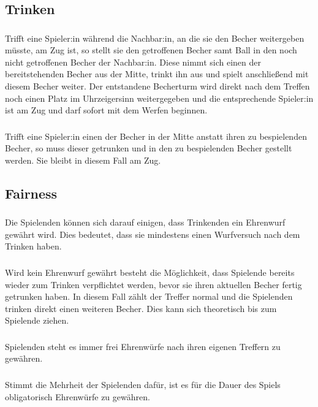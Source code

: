 \subsection{Trinken}
\subsubsection{}
Trifft eine Spieler:in während die Nachbar:in, an die sie den Becher weitergeben müsste, am Zug ist, so stellt sie den getroffenen Becher samt Ball in den noch nicht getroffenen Becher der Nachbar:in.
Diese nimmt sich einen der bereitstehenden Becher aus der Mitte, trinkt ihn aus und spielt anschließend mit diesem Becher weiter.
Der entstandene Becherturm wird direkt nach dem Treffen noch einen Platz im Uhrzeigersinn weitergegeben und die entsprechende Spieler:in ist am Zug und darf sofort mit dem Werfen beginnen.

\subsubsection{}
Trifft eine Spieler:in einen der Becher in der Mitte anstatt ihren zu bespielenden Becher, so muss dieser getrunken und in den zu bespielenden Becher gestellt werden.
Sie bleibt in diesem Fall am Zug.

\subsection{Fairness}
\subsubsection{}
Die Spielenden können sich darauf einigen, dass Trinkenden ein \glqq{} Ehrenwurf\grqq{} gewährt wird.
Dies bedeutet, dass sie mindestens einen Wurfversuch nach dem Trinken haben.

\subsubsection{}
Wird kein Ehrenwurf gewährt besteht die Möglichkeit, dass Spielende bereits wieder zum Trinken verpflichtet werden, bevor sie ihren aktuellen Becher fertig getrunken haben.
In diesem Fall zählt der Treffer normal und die Spielenden trinken direkt einen weiteren Becher.
Dies kann sich theoretisch bis zum Spielende ziehen.

\subsubsection{}
Spielenden steht es immer frei Ehrenwürfe nach ihren eigenen Treffern zu gewähren.

\subsubsection{}
Stimmt die Mehrheit der Spielenden dafür, ist es für die Dauer des Spiels obligatorisch Ehrenwürfe zu gewähren.
